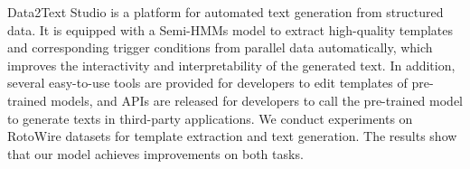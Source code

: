 Data2Text Studio is a platform for automated text generation from structured data. It is equipped with a Semi-HMMs model to extract high-quality templates and corresponding trigger conditions from parallel data automatically, which improves the interactivity and interpretability of the generated text. In addition, several easy-to-use tools are provided for developers to edit templates of pre-trained models, and APIs are released for developers to call the pre-trained model to generate texts in third-party applications. We conduct experiments on RotoWire datasets for template extraction and text generation. The results show that our model achieves improvements on both tasks.
